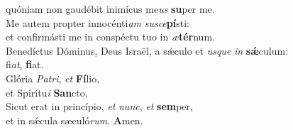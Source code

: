 \evenverse quóniam non gaudébit inimícus me\textit{us} \textbf{su}per me.\\
\oddverse Me autem propter innocénti\textit{am} \textit{su}\textit{sce}\textbf{pí}sti:~\*\\
\oddverse et confirmásti me in conspéctu tuo in \textit{æ}\textbf{tér}num.\\
\evenverse Benedíctus Dóminus, Deus Israël, a sǽculo et \textit{us}\textit{que} \textit{in} \textbf{sǽ}culum:~\*\\
\evenverse fi\textit{at}, \textbf{fi}at.\\
\oddverse Glória \textit{Pa}\textit{tri}, \textit{et} \textbf{Fí}lio,~\*\\
\oddverse et Spirítu\textit{i} \textbf{San}cto.\\
\evenverse Sicut erat in princípio, \textit{et} \textit{nunc}, \textit{et} \textbf{sem}per,~\*\\
\evenverse et in sǽcula sæculó\textit{rum}. \textbf{A}men.\\
